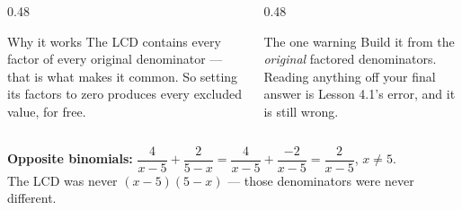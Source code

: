 \documentclass[aspectratio=169, 11pt]{beamer}
\begin{document}
\begin{frame}[t, plain]
  \begin{columns}[T]
    \begin{column}{0.48\textwidth}
      \begin{block}{Why it works}
        The LCD contains every factor of every original denominator --- that is what makes it common.
        So setting its factors to zero produces every excluded value, for free.
      \end{block}
    \end{column}
    \begin{column}{0.48\textwidth}
      \begin{block}{The one warning}
        Build it from the \emph{original} factored denominators. Reading anything off your final answer
        is Lesson 4.1's error, and it is still wrong.
      \end{block}
    \end{column}
  \end{columns}
  \vspace{8pt}
  \begin{center}
    \textbf{Opposite binomials:} $\dfrac{4}{x-5}+\dfrac{2}{5-x}=\dfrac{4}{x-5}+\dfrac{-2}{x-5}
    =\dfrac{2}{x-5}$, \; $x\neq5$. \\[3pt]
    {\footnotesize The LCD was never $(x-5)(5-x)$ --- those denominators were never different.}
  \end{center}
\end{frame}
\end{document}

